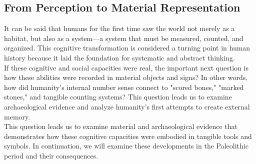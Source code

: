 \subsection{From Perception to Material Representation}

It can be said that humans for the first time saw the world not merely as a habitat, but also as a system—a system that must be measured, counted, and organized. This cognitive transformation is considered a turning point in human history because it laid the foundation for systematic and abstract thinking.\\
If these cognitive and social capacities were real, the important next question is how these abilities were recorded in material objects and signs? In other words, how did humanity's internal number sense connect to "scored bones," "marked stones," and tangible counting systems? This question leads us to examine archaeological evidence and analyze humanity's first attempts to create external memory.\\
This question leads us to examine material and archaeological evidence that demonstrates how these cognitive capacities were embodied in tangible tools and symbols. In continuation, we will examine these developments in the Paleolithic period and their consequences.
\newpage
